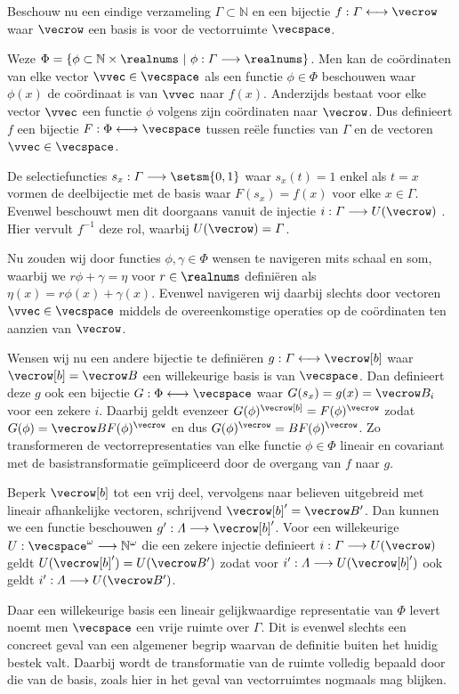 Beschouw nu een eindige verzameling $\varGamma \subset \mathbb{N}$ en een bijectie $f: \varGamma \longleftrightarrow \vecrow$ waar $\vecrow$ een basis is voor de vectorruimte $\vecspace$.

Weze $\Phi = \{ \phi \subset \mathbb{N}\times\realnums \ |\ \phi: \varGamma \longrightarrow \realnums \}$.
Men kan de coördinaten van elke vector $\vvec\in\vecspace$ als een functie $\phi\in\Phi$ beschouwen waar $\phi(x)$ de coördinaat is van $\vvec$ naar $f(x)$.
Anderzijds bestaat voor elke vector $\vvec$ een functie $\phi$ volgens zijn coördinaten naar $\vecrow$.
Dus definieert $f$ een bijectie $F: \Phi \longleftrightarrow \vecspace$ tussen reële functies van $\varGamma$ en de vectoren $\vvec\in\vecspace$.

De selectiefuncties $s_x: \varGamma \longrightarrow \setsm{0, 1}$ waar $s_x(t) = 1$ enkel als $t = x$ vormen de deelbijectie met de basis waar $F(s_x) = f(x)$ voor elke $x \in \varGamma$.
Evenwel beschouwt men dit doorgaans vanuit de injectie $i: \varGamma \longrightarrow U(\vecrow)$ .
Hier vervult $f^{-1}$ deze rol, waarbij $U(\vecrow) = \varGamma$.

Nu zouden wij door functies $\phi, \gamma \in \Phi$ wensen te navigeren mits schaal en som, waarbij we $r\phi + \gamma = \eta$ voor $r \in \realnums$ definiëren als $\eta(x) = r\phi(x) + \gamma(x)$.
Evenwel navigeren wij daarbij slechts door vectoren $\vvec\in\vecspace$ middels de overeenkomstige operaties op de coördinaten ten aanzien van $\vecrow$.

Wensen wij nu een andere bijectie te definiëren $g: \varGamma \longleftrightarrow \vecrow[b]$ waar $\vecrow[b] = \vecrow B$ een willekeurige basis is van $\vecspace$.
Dan definieert deze $g$ ook een bijectie $G: \Phi\longleftrightarrow\vecspace$ waar $G(s_x) = g(x) = \vecrow B_i$ voor een zekere $i$.
Daarbij geldt evenzeer $G(\phi)^{\vecrow[b]} = F(\phi)^{\vecrow}$ zodat $G(\phi) = \vecrow BF(\phi)^{\vecrow}$ en dus $G(\phi)^{\vecrow} = BF(\phi)^{\vecrow}$.
Zo transformeren de vectorrepresentaties van elke functie $\phi\in\Phi$ lineair en covariant met de basistransformatie geïmpliceerd door de overgang van $f$ naar $g$.

Beperk $\vecrow[b]$ tot een vrij deel, vervolgens naar believen uitgebreid met lineair afhankelijke vectoren, schrijvend $\vecrow[b]' = \vecrow B'$.
Dan kunnen we een functie beschouwen $g': \varLambda \longrightarrow \vecrow[b]'$.
Voor een willekeurige $U: \vecspace^{\mathbf\omega} \longrightarrow \mathbb{N}^{\mathbf\omega}$ die een zekere injectie definieert $i: \varGamma \longrightarrow U(\vecrow)$ geldt $U(\vecrow[b]') = U(\vecrow B')$ zodat voor $i': \varLambda\longrightarrow U(\vecrow[b]')$ ook geldt $i': \varLambda\longrightarrow U(\vecrow B')$.

Daar een willekeurige basis een lineair gelijkwaardige representatie van $\Phi$ levert noemt men $\vecspace$ een vrije ruimte over $\varGamma$.
Dit is evenwel slechts een concreet geval van een algemener begrip waarvan de definitie buiten het huidig bestek valt.
Daarbij wordt de transformatie van de ruimte volledig bepaald door die van de basis, zoals hier in het geval van vectorruimtes nogmaals mag blijken.